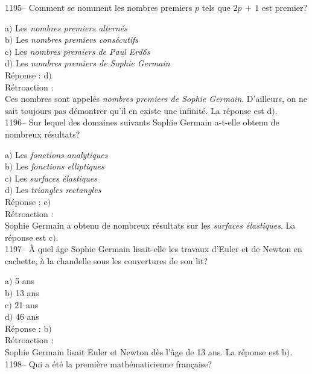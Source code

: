 ﻿\documentclass[letterpaper, 12pt]{article}
\begin{document}
1195-- Comment se nomment les nombres premiers $p$ tels que
$2p\,+\,1$ est premier?

a$)$ Les {\sl nombres premiers altern\'es} \\
b$)$ Les {\sl nombres premiers cons\'ecutifs} \\
c$)$ Les {\sl nombres premiers de Paul Erd\H{o}s} \\
d$)$ Les {\sl nombres premiers de Sophie Germain}\\

R\'eponse : d$)$\\

R\'etroaction : \\
Ces nombres sont appel\'es {\sl nombres premiers de Sophie Germain}.
D'ailleurs, on ne sait toujours pas d\'emontrer qu'il en existe une
infinit\'e.
La r\'eponse est d$)$.\\

1196-- Sur lequel des domaines suivants Sophie Germain a-t-elle
obtenu de nombreux r\'esultats?

a$)$ Les {\sl fonctions analytiques} \\
b$)$ Les {\sl fonctions elliptiques} \\
c$)$ Les {\sl surfaces \'elastiques} \\
d$)$ Les {\sl triangles rectangles}\\

R\'eponse : c$)$\\

R\'etroaction : \\
Sophie Germain a obtenu de nombreux r\'esultats sur les {\sl
surfaces \'elastiques}.
La r\'eponse est c$)$.\\

1197-- \`A quel \^age Sophie Germain lisait-elle les travaux d'Euler
et de Newton en cachette, \`a la chandelle sous les couvertures de
son lit?

a$)$ 5 ans \\
b$)$ 13 ans \\
c$)$ 21 ans \\
d$)$ 46 ans\\

R\'eponse : b$)$\\

R\'etroaction : \\
Sophie Germain lisait Euler et Newton d\`es l'\^age de 13 ans.
La r\'eponse est b$)$.\\

1198-- Qui a \'et\'e la premi\`ere math\'ematicienne fran\c caise?
\end{document}
